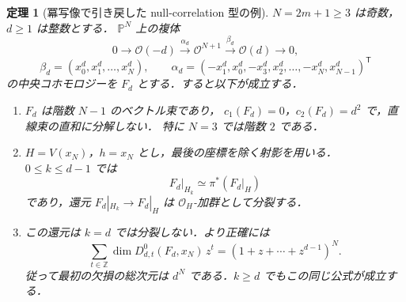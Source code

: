\documentclass[a4paper,11pt]{ltjsarticle}
\numberwithin{equation}{section}
\theoremstyle{plain}
\newtheorem{theorem}{定理}[section]
\theoremstyle{definition}
\theoremstyle{remark}
\begin{document}
\begin{theorem}[冪写像で引き戻した null-correlation 型の例]\label{thm:sharp-examples}
$N=2m+1\geq3$ は奇数，$d\geq1$ は整数とする．
$\mathbb P^N$ 上の複体
\[
 0\longrightarrow\mathcal O(-d)\xrightarrow{\alpha_d}
 \mathcal O^{N+1}\xrightarrow{\beta_d}\mathcal O(d)\longrightarrow0,
\]
\[
 \beta_d=(x_0^d,x_1^d,\ldots,x_N^d),\qquad
 \alpha_d=(-x_1^d,x_0^d,-x_3^d,x_2^d,\ldots,-x_N^d,x_{N-1}^d)^{\mathsf T}
\]
の中央コホモロジーを $F_d$ とする．すると以下が成立する．
\begin{enumerate}
\item $F_d$ は階数 $N-1$ のベクトル束であり，
      $c_1(F_d)=0$，$c_2(F_d)=d^2$ で，直線束の直和に分解しない．
      特に $N=3$ では階数 $2$ である．
\item $H=V(x_N)$，$h=x_N$ とし，最後の座標を除く射影を用いる．
      $0\leq k\leq d-1$ では
      \[
       F_d|_{H_k}\simeq\pi^*(F_d|_H)
      \]
      であり，還元 $F_d|_{H_k}\to F_d|_H$ は $\mathcal O_H$-加群として分裂する．
\item この還元は $k=d$ では分裂しない．より正確には
      \[
       \sum_{t\in\mathbb Z}\dim D^0_{d,t}(F_d,x_N)\,z^t
        =(1+z+\cdots+z^{d-1})^N.
      \]
      従って最初の欠損の総次元は $d^N$ である．$k\geq d$ でもこの同じ公式が成立する．
\end{enumerate}
\end{theorem}
\end{document}
